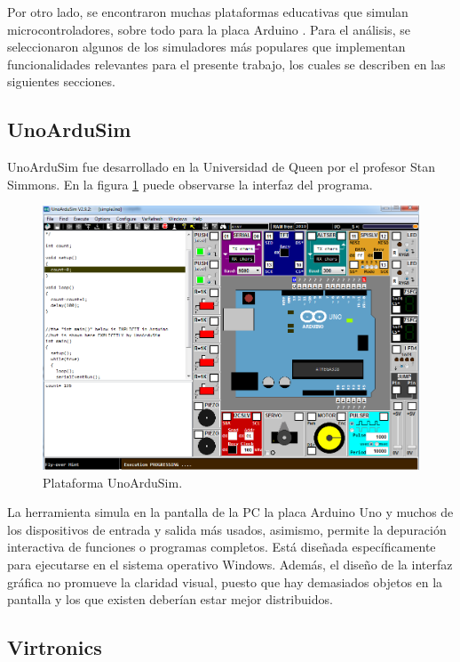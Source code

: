 Por otro lado, se encontraron muchas plataformas educativas que simulan microcontroladores, sobre todo para la placa Arduino \citep{Arduino}. Para el análisis, se seleccionaron algunos de los simuladores más populares que implementan funcionalidades relevantes para el presente trabajo, los cuales se describen en las siguientes secciones. 

\subsection{UnoArduSim}

UnoArduSim \citep{UnoArduSim} fue desarrollado en la Universidad de Queen \citep{Queensu} por el profesor Stan Simmons. En la figura \ref{fig:UnoArduSim} puede observarse la interfaz del programa.

\begin{figure}[ht]
	\centering
	\includegraphics[scale=.33]{./Figures/UnoArduSim.png}
	\caption{Plataforma UnoArduSim.}
	\label{fig:UnoArduSim}
\end{figure}

La herramienta simula en la pantalla de la PC la placa Arduino Uno \citep{ArduinoUno} y muchos de los dispositivos de entrada y salida más usados, asimismo, permite la depuración interactiva de funciones o programas completos. Está diseñada específicamente para ejecutarse en el sistema operativo Windows. Además, el diseño de la interfaz gráfica no promueve la claridad visual, puesto que hay demasiados objetos en la pantalla y los que existen deberían estar mejor distribuidos. 

\subsection{Virtronics}

